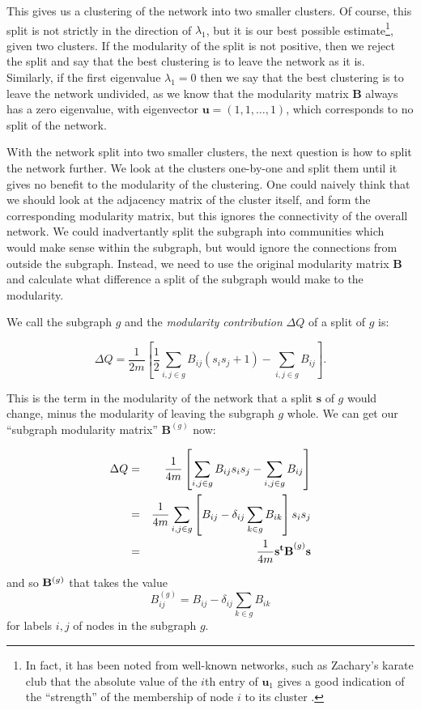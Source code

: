 This gives us a clustering of the network into two smaller clusters. Of course, 
this split is not strictly in the direction of $\lambda_1$, but it is our best 
possible estimate\footnote{In fact, it has been noted from well-known networks, 
such as Zachary's karate club \cite{Zachary1977a} that the absolute value of 
the $i$th entry of $\mathbf{u}_1$ gives a good indication of the ``strength'' 
of the membership of node $i$ to its cluster \cite{Newman2006a}.}, given two 
clusters. If the modularity of the split is not positive, then we reject the 
split and say that the best clustering is to leave the network as it is.  
Similarly, if the first eigenvalue $\lambda_1 = 0$ then we say that the best 
clustering is to leave the network undivided, as we know that the modularity 
matrix $\mathbf{B}$ always has a zero eigenvalue, with eigenvector 
$\mathbf{u} = ( 1,1, \ldots, 1)$, which corresponds to no split of the network.

With the network split into two smaller clusters, the next
question is how to split the network further.  We look at the clusters
one-by-one and split them until it gives no benefit to the modularity
of the clustering.  One could naively think that we should look at the
adjacency matrix of the cluster itself, and form the 
corresponding modularity matrix, but this ignores the connectivity of the
overall network.  We could inadvertantly split the subgraph into communities 
which would make sense within the subgraph, but would ignore the connections 
from outside the subgraph. Instead, we need to use the original modularity 
matrix $\mathbf{B}$ and calculate what difference a split of the subgraph would 
make to the modularity.

We call the subgraph $g$ and the {\sl modularity contribution} $\Delta Q$ of a 
split of $g$ is:

\begin{equation}
\Delta Q  =  \frac{1}{2m} \left[ \frac{1}{2}\sum_{i,j\in g}B_{ij}(s_is_j + 1) - \sum_{i,j \in g} B_{ij} \right].
\end{equation}

This is the term in the modularity of the network that a split $\mathbf{s}$ of 
$g$ would change, minus the modularity of leaving the subgraph $g$ whole.  We 
can get our ``subgraph modularity matrix'' $\mathbf{B}^{(g)}$ now:

\begin{samepage}
\begin{eqnarray}
\Delta Q & = & \frac{1}{4m}\left[ \sum_{i,j \in g} B_{ij}s_is_j - \sum_{i,j \in g}B_{ij}\right] \cr
& = & \frac{1}{4m}\sum_{i,j \in g}\left[ B_{ij} - \delta_{ij}\sum_{k \in g} B_{ik}\right]s_is_j \cr
& = & \frac{1}{4m}{\bf s^tB}^{(g)}{\bf s}
\end{eqnarray}
\end{samepage}
and so ${\bf B}^{(g)}$ that takes the value
\begin{equation}
B^{(g)}_{ij} = B_{ij} - \delta_{ij}\sum_{k \in g} B_{ik}
\end{equation}
for labels $i,j$ of nodes in the subgraph $g$.

